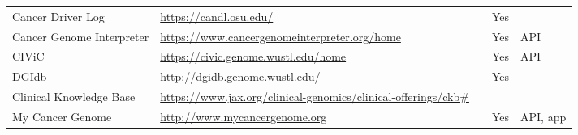 \documentclass{article}
\begin{document}
\begin{table}[p]
\centering
\begin{tabularx}{\textwidth}{p{3cm}XXp{1.5cm}p{1.5cm}}
  \hline
  Cancer Driver Log & \url{https://candl.osu.edu/} & \cite{Damodaran2015-so} & Yes & \\
  Cancer Genome Interpreter & \url{https://www.cancergenomeinterpreter.org/home} & \cite{Tamborero2017-ay} & Yes & API \\
  CIViC & \url{https://civic.genome.wustl.edu/home} & \cite{Griffith2016-sy} & Yes & API \\
  DGIdb & \url{http://dgidb.genome.wustl.edu/} & \cite{Wagner2016-fs,Griffith2013-uv} & Yes & \\
  Clinical Knowledge Base & \url{https://www.jax.org/clinical-genomics/clinical-offerings/ckb\#} & & & \\
  My Cancer Genome & \url{http://www.mycancergenome.org} & \cite{Micheel2014-pz} & Yes & API, app \\
 
 
 
 
 
 
 
 
 
 
 
 
 
 
 
 

\end{tabularx}
\end{table}
\end{document}
